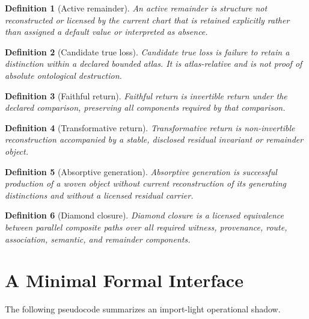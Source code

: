 \documentclass[12pt,openany]{book}
\newtheorem{definition}{Definition}[chapter]
\theoremstyle{remark}
\begin{document}
\begin{definition}[Active remainder]
An active remainder is structure not reconstructed or licensed by the current chart that is retained explicitly rather than assigned a default value or interpreted as absence.
\end{definition}

\begin{definition}[Candidate true loss]
Candidate true loss is failure to retain a distinction within a declared bounded atlas. It is atlas-relative and is not proof of absolute ontological destruction.
\end{definition}

\begin{definition}[Faithful return]
Faithful return is invertible return under the declared comparison, preserving all components required by that comparison.
\end{definition}

\begin{definition}[Transformative return]
Transformative return is non-invertible reconstruction accompanied by a stable, disclosed residual invariant or remainder object.
\end{definition}

\begin{definition}[Absorptive generation]
Absorptive generation is successful production of a woven object without current reconstruction of its generating distinctions and without a licensed residual carrier.
\end{definition}

\begin{definition}[Diamond closure]
Diamond closure is a licensed equivalence between parallel composite paths over all required witness, provenance, route, association, semantic, and remainder components.
\end{definition}

\chapter{A Minimal Formal Interface}
\label{app:formal-interface}

The following pseudocode summarizes an import-light operational shadow.
\end{document}
